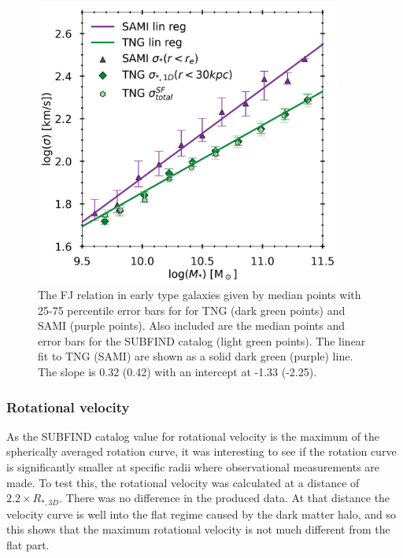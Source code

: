 \begin{figure}
    \centering
    \includegraphics[width=0.9\textwidth]{images/FJ.png}
    \caption{The FJ relation in early type galaxies given by median points with 25-75 percentile error bars for for TNG (dark green points) and SAMI (purple points). Also included are the median points and error bars for the SUBFIND catalog (light green points). The linear fit to TNG (SAMI) are shown as a solid dark green (purple) line. The slope is 0.32 (0.42) with an intercept at -1.33 (-2.25). }
    \label{FJ}
\end{figure}


\subsubsection{Rotational velocity}
As the SUBFIND catalog value for rotational velocity is the maximum of the spherically averaged rotation curve, it was interesting to see if the rotation curve is significantly smaller at specific radii where observational measurements are made. To test this, the rotational velocity was calculated at a distance of $2.2 \times R_{*, 3D}$. There was no difference in the produced data. At that distance the velocity curve is well into the flat regime caused by the dark matter halo, and so this shows that the maximum rotational velocity is not much different from the flat part.

